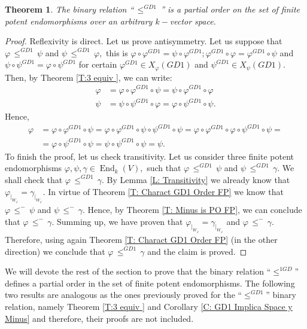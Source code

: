 \documentclass[10pt,a4paper]{amsart}
\newtheorem{thm}[defn]{Theorem}
\theoremstyle{plain}
\theoremstyle{remark}
\numberwithin{equation}{section} \numberwithin{defn}{section}
\newcommand\ed{\operatorname{End}}
\newcommand{\f}{\varphi}
\newcommand{\g}{\psi}
\begin{document}
\begin{thm}\label{T: GD1 Partial Order}
The binary relation ``$\, \leq^{GD1} \,$'' is a partial order on the set of finite potent endomorphisms over an arbitrary $k-$vector space.
\end{thm}
\begin{proof}
Reflexivity is direct. Let us prove antisymmetry. Let us suppose that $\f \, \leq^{GD1} \, \g$ and $\g \, \leq^{GD1} \, \f ,$ this is $\f\circ \f^{GD1}=\g\circ \f^{GD1} ; \f^{GD1}\circ \f=\f^{GD1}\circ \g$ and $\g \circ \g^{GD1}=\f\circ \g^{GD1}$ for certain $\f^{GD1}\in X_{\f}(GD1)$ and $\g^{GD1}\in X_{\g}(GD1).$ Then, by Theorem \ref{T:3 equiv  }, we can write: \begin{align*}
\f & = \f \circ \f^{GD1}\circ \g=\g \circ \f^{GD1}\circ \f \\
\g & = \g \circ \g^{GD1}\circ \f=\f \circ \g^{GD1}\circ \g.
\end{align*}
Hence, \begin{align*}
\f & =\f \circ \f^{GD1}\circ \g=\f \circ \f^{GD1}\circ \g \circ \g^{GD1}\circ \g= \f\circ \f^{GD1}\circ \f \circ \g^{GD1}\circ \g=\\& = \f \circ \g^{GD1}\circ \g=\g \circ \g^{GD1}\circ \g=\g.
\end{align*} To finish the proof, let us check transitivity. Let us consider three finite potent endomorphisms $\f, \g , \gamma \in \ed_k(V),$ such that $\f \, \leq^{GD1} \, \g$ and $\g \, \leq^{GD1} \, \gamma .$ We shall check that $\f \, \leq^{GD1} \, \gamma .$ By Lemma \ref{L: Transitivity} we already know that $\f_{\vert_{W_{\f}}}=\gamma_{\vert_{W_{\f}}}.$ In virtue of Theorem \ref{T: Charact GD1 Order FP} we know that $\f \, \leq^{-}\, \g$ and $\g \, \leq^{-} \, \gamma .$ Hence, by Theorem \ref{T: Minus is PO FP}, we can conclude that $\f \, \leq^{-}\, \gamma .$ Summing up, we have proven that $\f_{\vert_{W_{\f}}}=\gamma_{\vert_{W_{\f}}}$ and $\f \, \leq^{-}\, \gamma .$ Therefore, using again Theorem \ref{T: Charact GD1 Order FP} (in the other direction) we conclude that $\f \, \leq^{GD1} \, \gamma$ and the claim is proved.
\end{proof}


We will devote the rest of the section to prove that the binary relation ``$\leq^{1GD}$'' defines a partial order in the set of finite potent endomorphisms.
The following two results are analogous as the ones previously proved for the ``$\leq^{GD1}$'' binary relation, namely Theorem \ref{T:3 equiv  } and Corollary \ref{C: GD1 Implica Space y Minus} and therefore, their proofs are not included.
\end{document}
